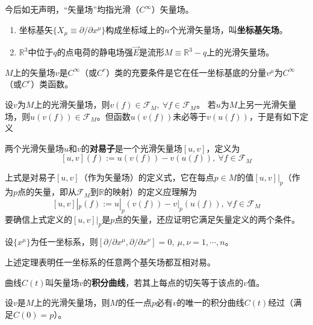 今后如无声明，``矢量场''均指光滑（$C^\infty$）矢量场。

\begin{example}
\begin{enumerate}[（1）]
\item 坐标基矢$\{X_\mu \equiv \partial / \partial x^\mu\}$构成坐标域上的$n$个光滑矢量场，叫\textbf{坐标基矢场}。
\item $\mathbb{R}^3$中位于$q$的点电荷的静电场强$\vec{E}$是流形$M \equiv \mathbb{R}^3 - {q}$上的光滑矢量场。
\end{enumerate}
\end{example}

\begin{theorem}
$M$上的矢量场$v$是$C^\infty$（或$C^r$）类的充要条件是它在任一坐标基底的分量$v^\mu$为$C^\infty$（或$C^r$）类函数。
\end{theorem}

设$v$为$M$上的光滑矢量场，则$v(f) \in \mathscr{F}_M, ~ \forall f \in \mathscr{F}_M$。
若$u$为$M$上另一光滑矢量场，则$u(v(f)) \in \mathscr{F}_M$。但函数$u(v(f))$未必等于$v(u(f))$，于是有如下定义

\begin{definition}
两个光滑矢量场$u$和$v$的\textbf{对易子}是一个光滑矢量场$[u, v]$，定义为
$$[u, v](f) := u(v(f)) - v(u(f)), ~ \forall f \in \mathscr{F}_M$$
\end{definition}

\begin{note}
上式是对易子$[u, v]$（作为矢量场）的定义式，它在每点$p \in M$的值$[u, v]|_p$（作为$p$点的矢量，即从$\mathscr{F}_M$到$\mathbb{R}$的映射）的定义应理解为
$$[u, v]|_p(f) := u|_p(v(f)) - v|_p(u(f)), ~ \forall f \in \mathscr{F}_M$$
要确信上式定义的$[u, v]|_p$是$p$点的矢量，还应证明它满足矢量定义的两个条件。
\end{note}

\begin{theorem}
设$\{x^\mu\}$为任一坐标系，则$[\partial / \partial x^\mu, \partial / \partial x^\nu] = 0, ~ \mu,\nu = 1, \cdots, n$。
\end{theorem}

上述定理表明任一坐标系的任意两个基矢场都互相对易。

\begin{definition}
曲线$C(t)$叫矢量场$v$的\textbf{积分曲线}，若其上每点的切矢等于该点的$v$值。
\end{definition}

\begin{theorem}
设$v$是$M$上的光滑矢量场，则$M$的任一点$p$必有$v$的唯一的积分曲线$C(t)$经过（满足$C(0) = p$）。
\end{theorem}

